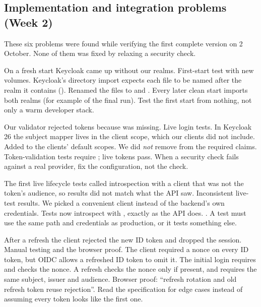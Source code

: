 \subsection{Implementation and integration problems (Week 2)}
\label{sec:mistakes-w2}
These six problems were found while verifying the first complete version on 2 October. None of them was fixed by relaxing a security check.

{On a fresh start Keycloak came up without our realms.}
{First-start test with new volumes.}
{Keycloak's directory import expects each file to be named after the realm it contains ().}
{Renamed the files to  and .}
{Every later clean start imports both realms (for example  of the final run).}
{Test the first start from nothing, not only a warm developer stack.}

{Our validator rejected tokens because  was missing.}
{Live login tests.}
{In Keycloak 26 the subject mapper lives in the  client scope, which our clients did not include.}
{Added  to the clients' default scopes. We did \emph{not} remove  from the required claims.}
{Token-validation tests require ; live tokens pass.}
{When a security check fails against a real provider, fix the configuration, not the check.}

{The first live lifecycle tests called introspection with a client that was not the token's audience, so results did not match what the API saw.}
{Inconsistent live-test results.}
{We picked a convenient client instead of the backend's own credentials.}
{Tests now introspect with , exactly as the API does.}
{.}
{A test must use the same path and credentials as production, or it tests something else.}

{After a refresh the client rejected the new ID token and dropped the session.}
{Manual testing and the browser proof.}
{The client required a nonce on every ID token, but OIDC allows a refreshed ID token to omit it.}
{The initial login requires and checks the nonce. A refresh checks the nonce only if present, and requires the same subject, issuer and audience.}
{Browser proof: ``refresh rotation and old refresh token reuse rejection''.}
{Read the specification for edge cases instead of assuming every token looks like the first one.}

